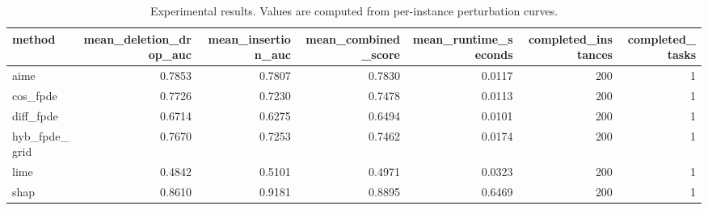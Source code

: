 \begin{table}[t]
\caption{Experimental results. Values are computed from per-instance perturbation curves.}
\label{tab:main_results_computed}
\centering
\begin{tabular}{lrrrrrr}
\toprule
method & mean\_deletion\_drop\_auc & mean\_insertion\_auc & mean\_combined\_score & mean\_runtime\_seconds & completed\_instances & completed\_tasks \\
\midrule
aime & 0.7853 & 0.7807 & 0.7830 & 0.0117 & 200 & 1 \\
cos\_fpde & 0.7726 & 0.7230 & 0.7478 & 0.0113 & 200 & 1 \\
diff\_fpde & 0.6714 & 0.6275 & 0.6494 & 0.0101 & 200 & 1 \\
hyb\_fpde\_grid & 0.7670 & 0.7253 & 0.7462 & 0.0174 & 200 & 1 \\
lime & 0.4842 & 0.5101 & 0.4971 & 0.0323 & 200 & 1 \\
shap & 0.8610 & 0.9181 & 0.8895 & 0.6469 & 200 & 1 \\
\bottomrule
\end{tabular}

\end{table}
